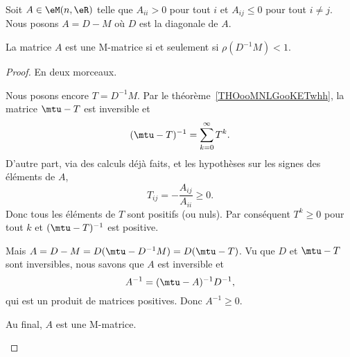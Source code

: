 \begin{proposition}     \label{PROPooWVHXooCfsvGq}
	Soit \( A\in \eM(n,\eR)\) telle que \( A_{ii}>0\) pour tout \( i\) et \( A_{ij}\leq 0\) pour tout \( i\neq j\). Nous posons \( A=D-M\) où \( D\) est la diagonale de \( A\).

	La matrice \( A\) est une M-matrice si et seulement si \( \rho(D^{-1}M)<1\).
\end{proposition}

\begin{proof}
	En deux morceaux.
	\begin{subproof}
		\spitem[Si \( \rho(D^{-1}M)<1\)]
		Nous posons encore \( T=D^{-1}M\). Par le théorème~\ref{THOooMNLGooKETwhh}, la matrice \( \mtu-T\) est inversible et
		\begin{equation}
			(\mtu-T)^{-1}=\sum_{k=0}^{\infty}T^k.
		\end{equation}
		D'autre part, via des calculs déjà faits, et les hypothèses sur les signes des éléments de \( A\),
		\begin{equation}
			T_{ij}=-\frac{ A_{ij} }{ A_{ii} }\geq 0.
		\end{equation}
		Donc tous les éléments de \( T\) sont positifs (ou nuls). Par conséquent \( T^k\geq 0\) pour tout \( k\) et \( (\mtu-T)^{-1}\) est positive.

		Mais \( A=D-M=D(\mtu-D^{-1}M)=D(\mtu-T)\). Vu que \( D\) et \( \mtu-T\) sont inversibles, nous savons que \( A\) est inversible et
		\begin{equation}
			A^{-1}=(\mtu-A)^{-1}D^{-1},
		\end{equation}
		qui est un produit de matrices positives. Donc \( A^{-1}\geq 0\).

		Au final, \( A\) est une M-matrice.




\end{subproof}
\end{proof}

